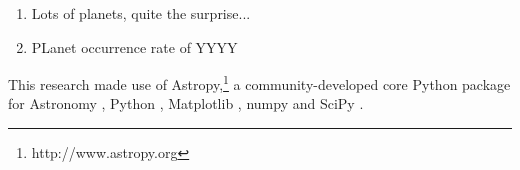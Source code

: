 \documentclass[onecolumn]{aa} %
\begin{document}
   \begin{enumerate}
      \item Lots of planets, quite the surprise...
      \item PLanet occurrence rate of YYYY
   \end{enumerate}

\begin{acknowledgements}
This research made use of Astropy,\footnote{http://www.astropy.org} a community-developed core Python package for Astronomy \citep{astropy:2013, astropy:2018}, Python \citep{vanRossum95,Oliphant07}, Matplotlib \citep{Hunter07}, numpy \citep{Oliphant06,vanderWalt11} and SciPy \citep{Virtanen20}.
\end{acknowledgements}



\end{document}
